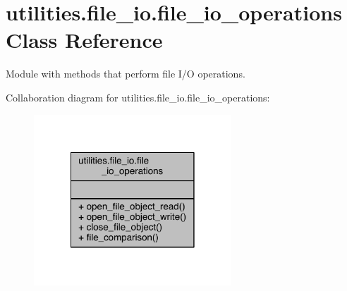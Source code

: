 \hypertarget{classutilities_1_1file__io_1_1file__io__operations}{}\section{utilities.\+file\+\_\+io.\+file\+\_\+io\+\_\+operations Class Reference}
\label{classutilities_1_1file__io_1_1file__io__operations}


Module with methods that perform file I/\+O operations.  




Collaboration diagram for utilities.\+file\+\_\+io.\+file\+\_\+io\+\_\+operations\+:\nopagebreak
\begin{figure}[H]
\begin{center}
\leavevmode
\includegraphics[width=210pt]{db/d83/classutilities_1_1file__io_1_1file__io__operations__coll__graph}
\end{center}
\end{figure}

